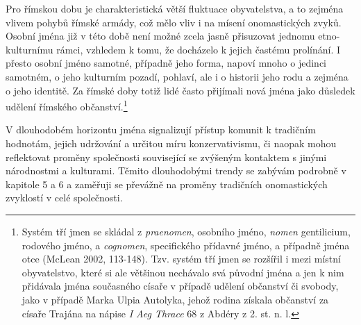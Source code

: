 Pro římskou dobu je charakteristická větší fluktuace obyvatelstva, a to zejména vlivem pohybů římské armády, což mělo vliv i na mísení onomastických zvyků. Osobní jména již v této době není možné zcela jasně přisuzovat jednomu etno-kulturnímu rámci, vzhledem k tomu, že docházelo k jejich častému prolínání. I přesto osobní jméno samotné, případně jeho forma, napoví mnoho o jedinci samotném, o jeho kulturním pozadí, pohlaví, ale i o historii jeho rodu a zejména o jeho identitě. Za římské doby totiž lidé často přijímali nová jména jako důsledek udělení římského občanství.\footnote{Systém tří jmen se skládal z {\em praenomen}, osobního jméno, {\em nomen} gentilicium, rodového jméno, a {\em cognomen}, specifického přídavné jméno, a případně jména otce (McLean 2002, 113-148). Tzv. systém tří jmen se rozšířil i mezi místní obyvatelstvo, které si ale většinou nechávalo svá původní jména a jen k nim přidávala jména současného císaře v případě udělení občanství či svobody, jako v případě Marka Ulpia Autolyka, jehož rodina získala občanství za císaře Trajána na nápise {\em I Aeg Thrace} 68 z Abdéry z 2. st. n. l.}

V dlouhodobém horizontu jména signalizují přístup komunit k tradičním hodnotám, jejich udržování a určitou míru konzervativismu, či naopak mohou reflektovat proměny společnosti související se zvýšeným kontaktem s jinými národnostmi a kulturami. Těmito dlouhodobými trendy se zabývám podrobně v kapitole 5 a 6 a zaměřuji se převážně na proměny tradičních onomastických zvyklostí v celé společnosti.

